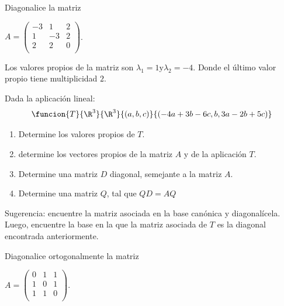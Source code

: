 \documentclass[10pt,a4]{examenEPN}
\begin{document}
\begin{preguntas}
\begin{respuesta}
\end{respuesta}
\item Diagonalice la matriz
\begin{center}
 $A = \left( \begin{matrix}
        -3 & 1 & 2\\
        1 & -3 & 2\\
        2 & 2 &  0\\
     \end{matrix}\right)$.   
\end{center}
\begin{respuesta}
Los valores propios de la matriz son $\lambda_1=1 \text{y} \lambda_2=-4$. Donde el \'ultimo valor propio tiene multiplicidad $2$.

\end{respuesta}

\item Dada la aplicación lineal:
\[
    \funcion{T}{\R^3}{\R^3}{(a,b,c)}{(-4a+3b-6c,b,3a-2b+5c)}
\]
\begin{enumerate}
    \item Determine los valores propios de $T$.
    \item 
    determine los vectores propios de la matriz $A$ y de la aplicación $T$.
    \item 
    Determine una matriz $D$ diagonal, semejante a la matriz $A$.
    \item 
    Determine una matriz $Q$, tal que $QD=AQ$
\end{enumerate}
\begin{respuesta}
Sugerencia: encuentre la matriz asociada en la base can\'onica y diagonal\'icela. Luego, encuentre la base en la que la matriz asociada de $T$ es la diagonal encontrada anteriormente. 
\end{respuesta}
\item 
Diagonalice ortogonalmente la matriz
\begin{center}
 $A = \left( \begin{matrix}
        0 & 1 & 1\\
        1 & 0 & 1\\
        1 & 1 &  0\\
     \end{matrix}\right)$.   
\end{center}
\end{preguntas}
\final
\end{document}
